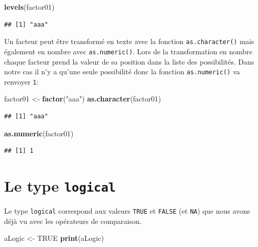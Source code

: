 \documentclass[]{book}
\newenvironment{Shaded}{\begin{snugshade}}{\end{snugshade}}
\newcommand{\KeywordTok}[1]{\textcolor[rgb]{0.13,0.29,0.53}{\textbf{#1}}}
\newcommand{\NormalTok}[1]{#1}
\newcommand{\OtherTok}[1]{\textcolor[rgb]{0.56,0.35,0.01}{#1}}
\newcommand{\StringTok}[1]{\textcolor[rgb]{0.31,0.60,0.02}{#1}}
\begin{document}
\begin{Shaded}
\begin{Highlighting}[]
\KeywordTok{levels}\NormalTok{(factor01)}
\end{Highlighting}
\end{Shaded}

\begin{verbatim}
## [1] "aaa"
\end{verbatim}

Un facteur peut être transformé en texte avec la fonction \texttt{as.character()} mais également en nombre avec \texttt{as.numeric()}. Lors de la transformation en nombre chaque facteur prend la valeur de sa position dans la liste des possibilités. Dans notre cas il n'y a qu'une seule possibilité donc la fonction \texttt{as.numeric()} va renvoyer \texttt{1}:

\begin{Shaded}
\begin{Highlighting}[]
\NormalTok{factor01 <-}\StringTok{ }\KeywordTok{factor}\NormalTok{(}\StringTok{"aaa"}\NormalTok{)}
\KeywordTok{as.character}\NormalTok{(factor01)}
\end{Highlighting}
\end{Shaded}

\begin{verbatim}
## [1] "aaa"
\end{verbatim}

\begin{Shaded}
\begin{Highlighting}[]
\KeywordTok{as.numeric}\NormalTok{(factor01)}
\end{Highlighting}
\end{Shaded}

\begin{verbatim}
## [1] 1
\end{verbatim}

\hypertarget{l013logi}{%
\section{\texorpdfstring{Le type \texttt{logical}}{Le type logical}}\label{l013logi}}

Le type \texttt{logical} correspond aux valeurs \texttt{TRUE} et \texttt{FALSE} (et \texttt{NA}) que nous avons déjà vu avec les opérateurs de comparaison.

\begin{Shaded}
\begin{Highlighting}[]
\NormalTok{aLogic <-}\StringTok{ }\OtherTok{TRUE}
\KeywordTok{print}\NormalTok{(aLogic)}
\end{Highlighting}
\end{Shaded}
\end{document}
